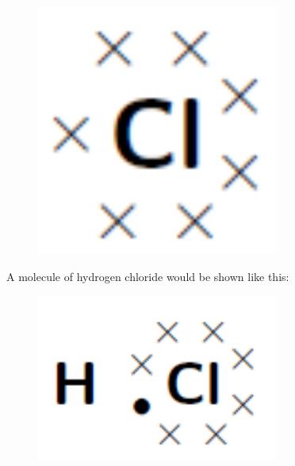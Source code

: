    \setcounter{subfigure}{0}


	\begin{figure}[H] %
    \begin{center}
    \label{m38701*id140157!!!underscore!!!media}\label{m38701*id140157!!!underscore!!!printimage}\includegraphics[width=300px]{col11305.imgs/m38701_CG11C1_007.png} %
        
      \vspace{2pt}
    \vspace{.1in}
    
    \end{center}

 \end{figure}   

    \addtocounter{footnote}{-0}
    
      \par 
      \label{m38701*id140164}A molecule of hydrogen chloride would be shown like this:\par 
      \label{m38701*id140168}
        
    \setcounter{subfigure}{0}


	\begin{figure}[H] %
    \begin{center}
    \label{m38701*id140171!!!underscore!!!media}\label{m38701*id140171!!!underscore!!!printimage}\includegraphics[width=300px]{col11305.imgs/m38701_CG11C1_008.png} %
        
      \vspace{2pt}
    \vspace{.1in}
    
    \end{center}

 \end{figure}   

